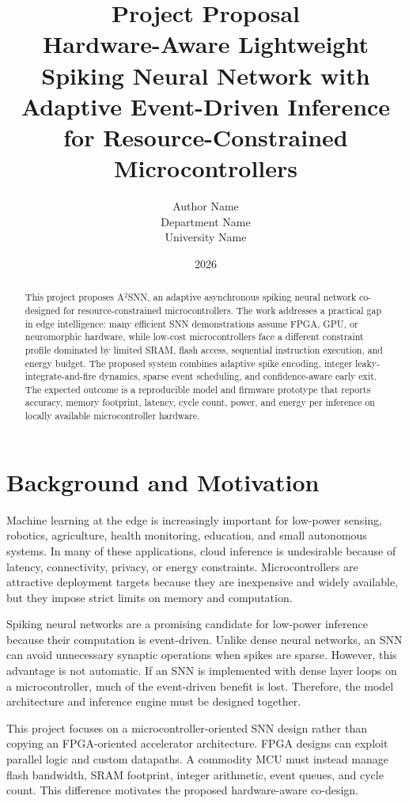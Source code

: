 \documentclass[12pt]{article}
\title{\textbf{Project Proposal}\\[4pt]
Hardware-Aware Lightweight Spiking Neural Network with Adaptive Event-Driven Inference for Resource-Constrained Microcontrollers}
\author{Author Name\\Department Name\\University Name}
\date{2026}
\newcommand{\modelname}{A$^2$SNN}
\begin{document}
\maketitle

\begin{abstract}
This project proposes \modelname, an adaptive asynchronous spiking neural network co-designed for resource-constrained microcontrollers. The work addresses a practical gap in edge intelligence: many efficient SNN demonstrations assume FPGA, GPU, or neuromorphic hardware, while low-cost microcontrollers face a different constraint profile dominated by limited SRAM, flash access, sequential instruction execution, and energy budget. The proposed system combines adaptive spike encoding, integer leaky-integrate-and-fire dynamics, sparse event scheduling, and confidence-aware early exit. The expected outcome is a reproducible model and firmware prototype that reports accuracy, memory footprint, latency, cycle count, power, and energy per inference on locally available microcontroller hardware.
\end{abstract}

\section{Background and Motivation}
Machine learning at the edge is increasingly important for low-power sensing, robotics, agriculture, health monitoring, education, and small autonomous systems. In many of these applications, cloud inference is undesirable because of latency, connectivity, privacy, or energy constraints. Microcontrollers are attractive deployment targets because they are inexpensive and widely available, but they impose strict limits on memory and computation.

Spiking neural networks are a promising candidate for low-power inference because their computation is event-driven. Unlike dense neural networks, an SNN can avoid unnecessary synaptic operations when spikes are sparse. However, this advantage is not automatic. If an SNN is implemented with dense layer loops on a microcontroller, much of the event-driven benefit is lost. Therefore, the model architecture and inference engine must be designed together.

This project focuses on a microcontroller-oriented SNN design rather than copying an FPGA-oriented accelerator architecture. FPGA designs can exploit parallel logic and custom datapaths. A commodity MCU must instead manage flash bandwidth, SRAM footprint, integer arithmetic, event queues, and cycle count. This difference motivates the proposed hardware-aware co-design.
\end{document}
